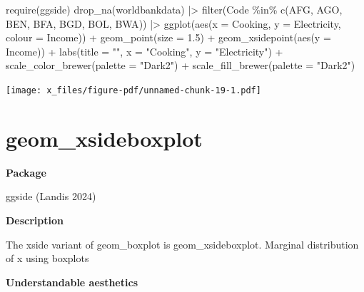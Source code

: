\documentclass[
  letterpaper,
  DIV=11,
  numbers=noendperiod]{scrreprt}
\newenvironment{Shaded}{\begin{snugshade}}{\end{snugshade}}
\newcommand{\AttributeTok}[1]{\textcolor[rgb]{0.40,0.45,0.13}{#1}}
\newcommand{\FloatTok}[1]{\textcolor[rgb]{0.68,0.00,0.00}{#1}}
\newcommand{\FunctionTok}[1]{\textcolor[rgb]{0.28,0.35,0.67}{#1}}
\newcommand{\NormalTok}[1]{\textcolor[rgb]{0.00,0.23,0.31}{#1}}
\newcommand{\SpecialCharTok}[1]{\textcolor[rgb]{0.37,0.37,0.37}{#1}}
\newcommand{\StringTok}[1]{\textcolor[rgb]{0.13,0.47,0.30}{#1}}
\begin{document}
\begin{Shaded}
\begin{Highlighting}[]
\FunctionTok{require}\NormalTok{(ggside)}
\FunctionTok{drop\_na}\NormalTok{(worldbankdata) }\SpecialCharTok{|\textgreater{}}
  \FunctionTok{filter}\NormalTok{(Code }\SpecialCharTok{\%in\%} \FunctionTok{c}\NormalTok{(}\StringTok{\textquotesingle{}AFG\textquotesingle{}}\NormalTok{, }\StringTok{\textquotesingle{}AGO\textquotesingle{}}\NormalTok{, }\StringTok{\textquotesingle{}BEN\textquotesingle{}}\NormalTok{, }\StringTok{\textquotesingle{}BFA\textquotesingle{}}\NormalTok{, }\StringTok{\textquotesingle{}BGD\textquotesingle{}}\NormalTok{, }\StringTok{\textquotesingle{}BOL\textquotesingle{}}\NormalTok{, }\StringTok{\textquotesingle{}BWA\textquotesingle{}}\NormalTok{)) }\SpecialCharTok{|\textgreater{}} 
  \FunctionTok{ggplot}\NormalTok{(}\FunctionTok{aes}\NormalTok{(}\AttributeTok{x =}\NormalTok{ Cooking, }\AttributeTok{y =}\NormalTok{ Electricity, }\AttributeTok{colour =}\NormalTok{ Income)) }\SpecialCharTok{+}
  \FunctionTok{geom\_point}\NormalTok{(}\AttributeTok{size =} \FloatTok{1.5}\NormalTok{) }\SpecialCharTok{+}
  \FunctionTok{geom\_xsidepoint}\NormalTok{(}\FunctionTok{aes}\NormalTok{(}\AttributeTok{y =}\NormalTok{ Income)) }\SpecialCharTok{+}
  \FunctionTok{labs}\NormalTok{(}\AttributeTok{title =} \StringTok{""}\NormalTok{, }\AttributeTok{x =} \StringTok{"Cooking"}\NormalTok{, }\AttributeTok{y =} \StringTok{"Electricity"}\NormalTok{)  }\SpecialCharTok{+} \FunctionTok{scale\_color\_brewer}\NormalTok{(}\AttributeTok{palette =} \StringTok{"Dark2"}\NormalTok{) }\SpecialCharTok{+} \FunctionTok{scale\_fill\_brewer}\NormalTok{(}\AttributeTok{palette =} \StringTok{"Dark2"}\NormalTok{)}
\end{Highlighting}
\end{Shaded}

\texttt{[image: x\_files/figure-pdf/unnamed-chunk-19-1.pdf]}

\section{geom\_xsideboxplot}\label{xsideboxplot}

\textbf{Package}

ggside (Landis 2024)

\textbf{Description}

The xside variant of geom\_boxplot is geom\_xsideboxplot. Marginal
distribution of x using boxplots

\textbf{Understandable aesthetics}
\end{document}

